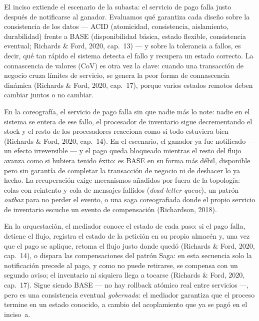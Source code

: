 
El inciso extiende el escenario de la subasta: el servicio de pago falla justo
después de notificarse al ganador. Evaluamos qué garantiza cada diseño sobre la
consistencia de los datos --- ACID (atomicidad, consistencia, aislamiento,
durabilidad) frente a BASE (disponibilidad básica, estado flexible, consistencia
eventual; Richards \& Ford, 2020, cap.~13) --- y sobre la tolerancia a fallos, es
decir, qué tan rápido el sistema detecta el fallo y recupera un estado correcto.
La connascencia de valores (CoV) es otra vez la clave: cuando una transacción de
negocio cruza límites de servicio, se genera la peor forma de connascencia
dinámica (Richards \& Ford, 2020, cap.~17), porque varios estados remotos deben
cambiar juntos o no cambiar.

En la coreografía, el servicio de pago falla sin que nadie más lo note: nadie en
el sistema se entera de ese fallo, el procesador de inventario sigue
decrementando el stock y el resto de los procesadores reacciona como si todo
estuviera bien (Richards \& Ford, 2020, cap.~14). En el escenario, el
ganador ya fue notificado --- un efecto irreversible --- y el pago queda
bloqueado mientras el resto del flujo avanza como si hubiera tenido éxito: es
BASE en su forma más débil, disponible pero sin garantía de completar la
transacción de negocio ni de deshacer lo ya hecho. La recuperación exige
mecanismos añadidos por fuera de la topología: colas con reintento y cola de
mensajes fallidos (\emph{dead-letter queue}), un patrón \emph{outbox} para no
perder el evento, o una saga coreografiada donde el propio servicio de inventario
escuche un evento de compensación (Richardson, 2018).

En la orquestación, el mediador conoce el estado de cada paso: si el pago falla,
detiene el flujo, registra el estado de la petición en su propio almacén y, una
vez que el pago se aplique, retoma el flujo justo donde quedó (Richards \& Ford,
2020, cap.~14), o dispara las compensaciones del patrón
Saga: en esta secuencia solo la notificación precede al pago, y como no puede
retirarse, se compensa con un segundo aviso; el inventario ni siquiera llega a
tocarse (Richards \& Ford, 2020, cap.~17). Sigue siendo BASE --- no hay rollback atómico real entre servicios ---,
pero es una consistencia eventual \emph{gobernada}: el mediador garantiza que el
proceso termine en un estado conocido, a cambio del acoplamiento que ya se pagó
en el inciso~a.

